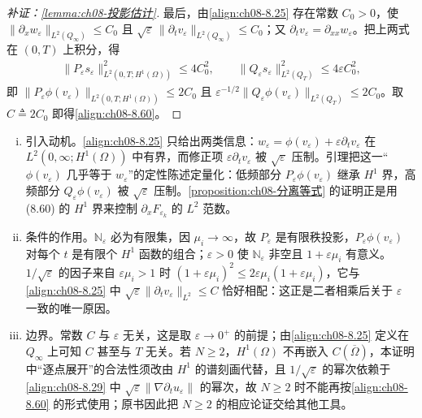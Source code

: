 \documentclass[../../main.tex]{subfiles}%
\begin{document}
\begin{proof}[补证：\cref{lemma:ch08-投影估计}]
最后，由\eqref{align:ch08-8.25} 存在常数 $C_0>0$，使 $\|\partial_xw_\varepsilon\|_{L^2(Q_\infty)}\leqslant C_0$ 且 $\sqrt\varepsilon\,\|\partial_tv_\varepsilon\|_{L^2(Q_\infty)}\leqslant C_0$；又 $\partial_tv_\varepsilon=\partial_{xx}w_\varepsilon$。把上两式在 $(0,T)$ 上积分，得
\begin{align*}
\|P_\varepsilon s_\varepsilon\|^2_{L^2(0,T;H^1(\Omega))}\leqslant4C_0^2,\qquad
\|Q_\varepsilon s_\varepsilon\|^2_{L^2(Q_T)}\leqslant4\varepsilon C_0^2,
\end{align*}
即 $\|P_\varepsilon\phi(v_\varepsilon)\|_{L^2(0,T;H^1(\Omega))}\leqslant2C_0$ 且 $\varepsilon^{-1/2}\|Q_\varepsilon\phi(v_\varepsilon)\|_{L^2(Q_T)}\leqslant2C_0$。取 $C\triangleq2C_0$ 即得\eqref{align:ch08-8.60}。
\end{proof}

\begin{remark}\label{remark:ch08-投影估计}
\begin{enumerate}[(i)]
\item 引入动机。\eqref{align:ch08-8.25} 只给出两类信息：$w_\varepsilon=\phi(v_\varepsilon)+\varepsilon\partial_tv_\varepsilon$ 在 $L^2(0,\infty;H^1(\Omega))$ 中有界，而修正项 $\varepsilon\partial_tv_\varepsilon$ 被 $\sqrt\varepsilon$ 压制。引理把这一“$\phi(v_\varepsilon)$ 几乎等于 $w_\varepsilon$”的定性陈述定量化：低频部分 $P_\varepsilon\phi(v_\varepsilon)$ 继承 $H^1$ 界，高频部分 $Q_\varepsilon\phi(v_\varepsilon)$ 被 $\sqrt\varepsilon$ 压制。\cref{proposition:ch08-分离等式} 的证明正是用 (8.60) 的 $H^1$ 界来控制 $\partial_xF_{\varepsilon_k}$ 的 $L^2$ 范数。
\item 条件的作用。$\mathbb{N}_\varepsilon$ 必为有限集，因 $\mu_i\to\infty$，故 $P_\varepsilon$ 是有限秩投影，$P_\varepsilon\phi(v_\varepsilon)$ 对每个 $t$ 是有限个 $H^1$ 函数的组合；$\varepsilon>0$ 使 $\mathbb{N}_\varepsilon$ 非空且 $1+\varepsilon\mu_i$ 有意义。$1/\sqrt\varepsilon$ 的因子来自 $\varepsilon\mu_i>1$ 时 $(1+\varepsilon\mu_i)^2\leqslant2\varepsilon\mu_i(1+\varepsilon\mu_i)$，它与\eqref{align:ch08-8.25} 中 $\sqrt\varepsilon\|\partial_tv_\varepsilon\|_{L^2}\leqslant C$ 恰好相配：这正是二者相乘后关于 $\varepsilon$ 一致的唯一原因。
\item 边界。常数 $C$ 与 $\varepsilon$ 无关，这是取 $\varepsilon\to0^+$ 的前提；由\eqref{align:ch08-8.25} 定义在 $Q_\infty$ 上可知 $C$ 甚至与 $T$ 无关。若 $N\geqslant2$，$H^1(\Omega)$ 不再嵌入 $C(\overline\Omega)$，本证明中“逐点展开”的合法性须改由 $H^1$ 的谱刻画代替，且 $1/\sqrt\varepsilon$ 的幂次依赖于\eqref{align:ch08-8.29} 中 $\sqrt\varepsilon\|\nabla\partial_tu_\varepsilon\|$ 的幂次，故 $N\geqslant2$ 时不能再按\eqref{align:ch08-8.60} 的形式使用；原书因此把 $N\geqslant2$ 的相应论证交给其他工具。
\end{enumerate}
\end{remark}
\end{document}
